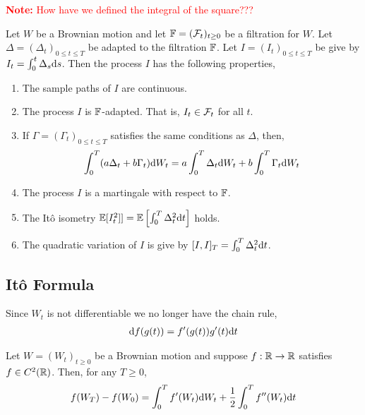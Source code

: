 \documentclass[12pt]{article}
\newcommand{\note}[1]{\textcolor{red}{\textbf{Note:} #1}}
\begin{document}
\note{How have we defined the integral of the square???}

\begin{theorem}
Let \( W \) be a Brownian motion and let \( \mathbb{F} = (\mathcal{F}_t)_{t\geq 0} \) be a filtration for \( W \). Let \( \Delta = (\Delta_t)_{0\leq t\leq T} \) be adapted to the filtration \( \mathbb{F} \). Let \( I = (I_t)_{0\leq t\leq T} \) be give by \( I_t = \int_0^t \Delta_s\mathrm{d} s \). Then the process \( I \) has the following properties,
\begin{enumerate}[nolistsep]
    \item The sample paths of \( I \) are continuous.
    \item The process \( I \) is \( \mathbb{F} \)-adapted. That is, \( I_t\in\mathcal{F}_t \) for all \( t \).
    \item If \( \Gamma = (\Gamma_t)_{0\leq t\leq T} \) satisfies the same conditions as \( \Delta \), then,
    \begin{align*}
        \int_0^T(a\Delta_t + b\Gamma_t)\mathrm{d} W_t = a\int_0^T \Delta_t \mathrm{d} W_t + b\int_0^T \Gamma_t \mathrm{d} W_t
    \end{align*}
    \item The process \( I \) is a martingale with respect to \( \mathbb{F} \).
    \item The It\^o isometry \( \mathbb{E}[I_t^2]] = \mathbb{E} \left[ \int_0^T \Delta_t^2 \mathrm{d} t \right] \) holds.
    \item The quadratic variation of \( I \) is give by \( [I,I]_T = \int_0^T \Delta_t^2 \mathrm{d} t \).
\end{enumerate}
\end{theorem}

\subsection{It\^o Formula}
Since \( W_t \) is not differentiable we no longer have the chain rule,
\begin{align*}
    \mathrm{d} f(g(t)) = f'(g(t)) g'(t)\mathrm{d} t
\end{align*}

\begin{theorem}
Let \( W = (W_t)_{t\geq 0} \) be a Brownian motion and suppose \( f:\mathbb{R}\to\mathbb{R} \) satisfies \( f\in C^2(\mathbb{R}) \). Then, for any \( T \geq 0 \),
\begin{align*}
    f(W_T) - f(W_0) = \int_0^T f'(W_t)\mathrm{d} W_t + \frac{1}{2} \int_0^T f''(W_t)\mathrm{d} t
\end{align*}
\end{theorem}
\end{document}
